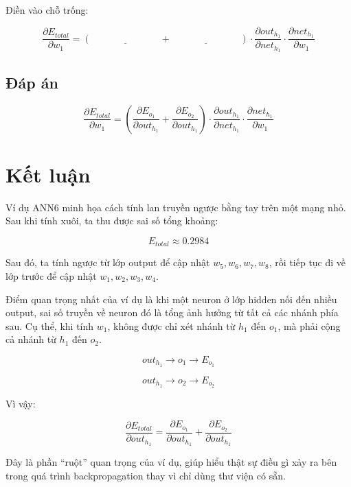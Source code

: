 Điền vào chỗ trống:

\[
    \frac{\partial E_{total}}{\partial w_1}
    =
    \left(
    \underline{\hspace{3cm}}
    +
    \underline{\hspace{3cm}}
    \right)
    \cdot
    \frac{\partial out_{h_1}}{\partial net_{h_1}}
    \cdot
    \frac{\partial net_{h_1}}{\partial w_1}
\]

\subsection*{Đáp án}

\[
    \frac{\partial E_{total}}{\partial w_1}
    =
    \left(
    \frac{\partial E_{o_1}}{\partial out_{h_1}}
    +
    \frac{\partial E_{o_2}}{\partial out_{h_1}}
    \right)
    \cdot
    \frac{\partial out_{h_1}}{\partial net_{h_1}}
    \cdot
    \frac{\partial net_{h_1}}{\partial w_1}
\]

\section*{Kết luận}

Ví dụ ANN6 minh họa cách tính lan truyền ngược bằng tay trên một mạng nhỏ. Sau khi tính xuôi, ta thu được sai số tổng khoảng:

\[
    E_{total}\approx 0.2984
\]

Sau đó, ta tính ngược từ lớp output để cập nhật $w_5,w_6,w_7,w_8$, rồi tiếp tục đi về lớp trước để cập nhật $w_1,w_2,w_3,w_4$.

Điểm quan trọng nhất của ví dụ là khi một neuron ở lớp hidden nối đến nhiều output, sai số truyền về neuron đó là tổng ảnh hưởng từ tất cả các nhánh phía sau. Cụ thể, khi tính $w_1$, không được chỉ xét nhánh từ $h_1$ đến $o_1$, mà phải cộng cả nhánh từ $h_1$ đến $o_2$.

\[
    out_{h_1}
    \rightarrow
    o_1
    \rightarrow
    E_{o_1}
\]

\[
    out_{h_1}
    \rightarrow
    o_2
    \rightarrow
    E_{o_2}
\]

Vì vậy:

\[
    \frac{\partial E_{total}}{\partial out_{h_1}}
    =
    \frac{\partial E_{o_1}}{\partial out_{h_1}}
    +
    \frac{\partial E_{o_2}}{\partial out_{h_1}}
\]

Đây là phần ``ruột'' quan trọng của ví dụ, giúp hiểu thật sự điều gì xảy ra bên trong quá trình backpropagation thay vì chỉ dùng thư viện có sẵn.

